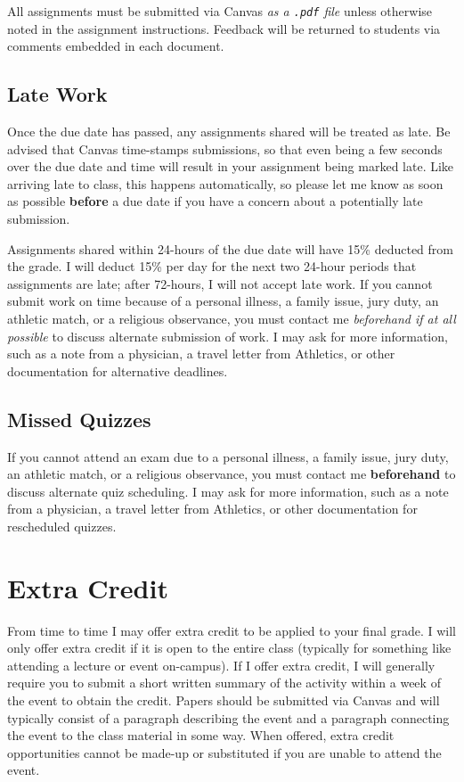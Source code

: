 \documentclass[
]{book}
\begin{document}
All assignments must be submitted via Canvas \emph{as a \texttt{.pdf} file} unless otherwise noted in the assignment instructions. Feedback will be returned to students via comments embedded in each document.

\hypertarget{late-work}{%
\subsection{Late Work}\label{late-work}}

Once the due date has passed, any assignments shared will be treated as late. Be advised that Canvas time-stamps submissions, so that even being a few seconds over the due date and time will result in your assignment being marked late. Like arriving late to class, this happens automatically, so please let me know as soon as possible \textbf{before} a due date if you have a concern about a potentially late submission.

Assignments shared within 24-hours of the due date will have 15\% deducted from the grade. I will deduct 15\% per day for the next two 24-hour periods that assignments are late; after 72-hours, I will not accept late work. If you cannot submit work on time because of a personal illness, a family issue, jury duty, an athletic match, or a religious observance, you must contact me \emph{beforehand if at all possible} to discuss alternate submission of work. I may ask for more information, such as a note from a physician, a travel letter from Athletics, or other documentation for alternative deadlines.

\hypertarget{missed-quizzes}{%
\subsection{Missed Quizzes}\label{missed-quizzes}}

If you cannot attend an exam due to a personal illness, a family issue, jury duty, an athletic match, or a religious observance, you must contact me \textbf{beforehand} to discuss alternate quiz scheduling. I may ask for more information, such as a note from a physician, a travel letter from Athletics, or other documentation for rescheduled quizzes.

\hypertarget{extra-credit}{%
\section{Extra Credit}\label{extra-credit}}

From time to time I may offer extra credit to be applied to your final grade. I will only offer extra credit if it is open to the entire class (typically for something like attending a lecture or event on-campus). If I offer extra credit, I will generally require you to submit a short written summary of the activity within a week of the event to obtain the credit. Papers should be submitted via Canvas and will typically consist of a paragraph describing the event and a paragraph connecting the event to the class material in some way. When offered, extra credit opportunities cannot be made-up or substituted if you are unable to attend the event.
\end{document}
